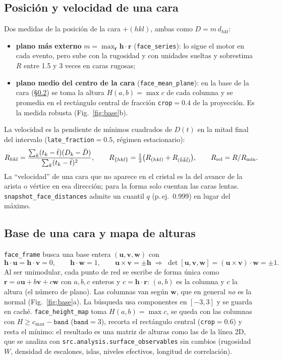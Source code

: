 \documentclass[11pt,a4paper]{article}
\newcommand{\code}[1]{\texttt{#1}}
\newcommand{\vect}[1]{\mathbf{#1}}
\begin{document}
\subsection{Posición y velocidad de una cara}

Dos medidas de la posición de la cara $+(hkl)$, ambas como $D=m\,d_{hkl}$:
\begin{itemize}
\item \textbf{plano más externo} $m=\max_{\vect r}\vect h\cdot\vect r$ (\code{face\_series}): lo sigue
el motor en cada evento, pero sube con la rugosidad y con unidades sueltas y sobrestima $R$ entre 1.5 y
3 veces en caras rugosas;
\item \textbf{plano medio del centro de la cara} (\code{face\_mean\_plane}): en la base de la cara
(\S\ref{sec:base}) se toma la altura $H(a,b)=\max c$ de cada columna y se promedia en el rectángulo
central de fracción \code{crop}$=0.4$ de la proyección. Es la medida robusta (Fig.~\ref{fig:base}b).
\end{itemize}
La velocidad es la pendiente de mínimos cuadrados de $D(t)$ en la mitad final del intervalo
(\code{late\_fraction}$=0.5$, régimen estacionario):
\begin{equation}
R_{hkl}=\frac{\sum_k(t_k-\bar t)(D_k-\bar D)}{\sum_k(t_k-\bar t)^2},\qquad
R_{\{hkl\}}=\tfrac12\bigl(R_{(hkl)}+R_{(\bar h\bar k\bar l)}\bigr),\qquad R_{\rm rel}=R/R_{\min}.
\label{eq:R}
\end{equation}
La ``velocidad'' de una cara que no aparece en el cristal es la del avance de la arista o vértice en esa
dirección; para la forma solo cuentan las caras lentas. \code{snapshot\_face\_distances} admite un
cuantil $q$ (p.\,ej.\ 0.999) en lugar del máximo.

\subsection{Base de una cara y mapa de alturas}
\label{sec:base}

\code{face\_frame} busca una base entera $(\vect u,\vect v,\vect w)$ con
\begin{equation}
\vect h\cdot\vect u=\vect h\cdot\vect v=0,\qquad \vect h\cdot\vect w=1,\qquad \vect u\times\vect v=\pm\vect h
\;\Longrightarrow\;\det[\vect u,\vect v,\vect w]=(\vect u\times\vect v)\cdot\vect w=\pm1 .
\label{eq:base}
\end{equation}
Al ser unimodular, cada punto de red se escribe de forma única como $\vect r=a\vect u+b\vect v+c\vect w$
con $a,b,c$ enteros y $c=\vect h\cdot\vect r$: $(a,b)$ es la columna y $c$ la altura (el número de
plano). Las columnas van según $\vect w$, que en general \emph{no} es la normal (Fig.~\ref{fig:base}a).
La búsqueda usa componentes en $[-3,3]$ y se guarda en caché. \code{face\_height\_map} toma
$H(a,b)=\max c$, se queda con las columnas con $H\ge c_{\max}-\code{band}$ ($\code{band}=3$), recorta el
rectángulo central (\code{crop}$=0.6$) y resta el mínimo: el resultado es una matriz de alturas como
las de la línea 2D, que se analiza con \code{src.analysis.surface\_observables} sin cambios
(rugosidad $W$, densidad de escalones, islas, niveles efectivos, longitud de correlación).
\end{document}
